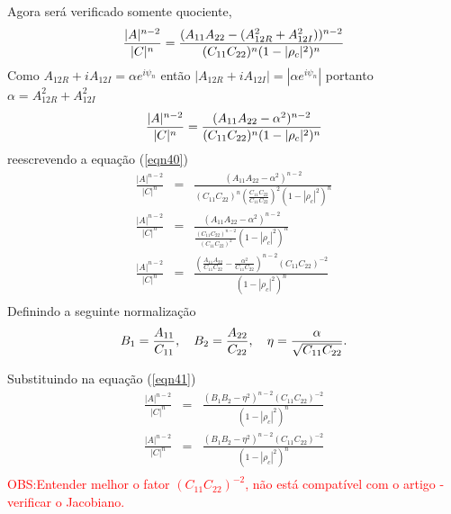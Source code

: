 \documentclass[12pt,a4paper]{article}
\begin{document}
Agora será verificado somente quociente,
\begin{equation}\label{eqn39}
	\frac{|A|^{n-2}}{|C|^{n}}=\frac{(A_{11}A_{22}-(A_{12R}^2+A_{12I}^2))^{n-2}}{(C_{11}C_{22})^{n}(1-|\rho_c|^2)^{n}}\\
\end{equation}
Como  $A_{12R}+iA_{12I}=\alpha e^{i\psi_n}$ então $|A_{12R}+iA_{12I}|=|\alpha e^{i\psi_n}|$ portanto $\alpha=A_{12R}^2+A_{12I}^2$ 
\begin{equation}\label{eqn40}
	\frac{|A|^{n-2}}{|C|^{n}}=\frac{(A_{11}A_{22}-\alpha^2)^{n-2}}{(C_{11}C_{22})^{n}(1-|\rho_c|^2)^{n}}\\
\end{equation}
reescrevendo a equação (\ref{eqn40})
\begin{equation}\label{eqn41}
\begin{array}{ccc}
	\frac{|A|^{n-2}}{|C|^{n}}&=&\frac{(A_{11}A_{22}-\alpha^2)^{n-2}}{(C_{11}C_{22})^{n}\left(\frac{C_{11}C_{22}}{C_{11}C_{22}}\right)^2(1-|\rho_c|^2)^{n}}\\
	\frac{|A|^{n-2}}{|C|^{n}}&=&\frac{(A_{11}A_{22}-\alpha^2)^{n-2}}{\frac{(C_{11}C_{22})^{n-2}}{\left(C_{11}C_{22}\right)^2}(1-|\rho_c|^2)^{n}}\\
	\frac{|A|^{n-2}}{|C|^{n}}&=&\frac{\left(\frac{A_{11}A_{22}}{C_{11}C_{22}}-\frac{\alpha^2}{C_{11}C_{22}}\right)^{n-2}(C_{11}C_{22})^{-2}}{(1-|\rho_c|^2)^{n}}\\
\end{array}
\end{equation}
Definindo a seguinte normalização 
\begin{equation}\label{eqn42}
	B_1=\frac{A_{11}}{C_{11}},\quad B_2=\frac{A_{22}}{C_{22}},\quad\eta=\frac{\alpha}{\sqrt{C_{11}C_{22}}}.\\
\end{equation}

Substituindo na equação (\ref{eqn41})
\begin{equation}\label{eqn43}
\begin{array}{ccc}
	\frac{|A|^{n-2}}{|C|^{n}}&=&\frac{\left(B_1B_2-\eta^2\right)^{n-2}(C_{11}C_{22})^{-2}}{(1-|\rho_c|^2)^{n}}\\
	\frac{|A|^{n-2}}{|C|^{n}}&=&\frac{\left(B_1B_2-\eta^2\right)^{n-2}(C_{11}C_{22})^{-2}}{(1-|\rho_c|^2)^{n}}\\
\end{array}
\end{equation}
\textcolor{red}{OBS:Entender melhor o fator $(C_{11}C_{22})^{-2}$, não está compatível com o artigo \cite{lee94}- verificar o Jacobiano.}
\end{document}
